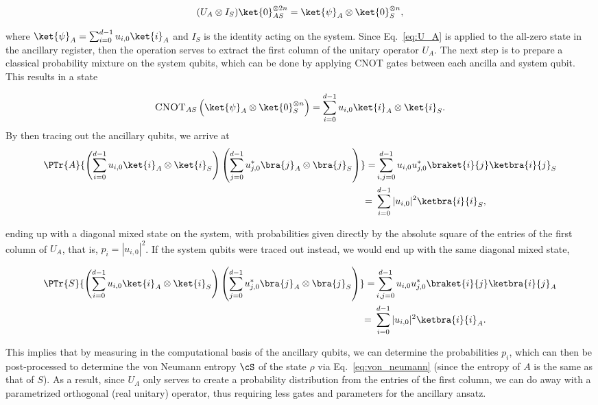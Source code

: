 \begin{equation}
    (U_A \otimes I_S) \ket{0}_{AS}^{\otimes 2n} = \ket{\psi}_{A} \otimes \ket{0}_{S}^{\otimes n},
    \label{eq:U_A}
\end{equation}

where $\ket{\psi}_A = \sum_{i=0}^{d - 1} u_{i,0} \ket{i}_A$ and $I_S$
is the identity acting on the system. Since Eq.~\eqref{eq:U_A} is
applied to the all-zero state in the ancillary register, then the
operation serves to extract the first column of the unitary operator
$U_A$. The next step is to prepare a classical probability mixture on
the system qubits, which can be done by applying \textsc{CNOT} gates
between each ancilla and system qubit. This results in a state

\begin{align}
    \textsc{CNOT}_{AS} \left( \ket{\psi}_{A} \otimes \ket{0}_{S}^{\otimes n} \right) = \sum_{i=0}^{d - 1} u_{i,0} \ket{i}_A \otimes \ket{i}_S.
    \label{eq:pre_tfd}
\end{align}
By then tracing out the ancillary qubits, we arrive at
\begin{align}
    \PTr{A}{\left( \sum_{i=0}^{d-1} u_{i,0}\ket{i}_A \otimes \ket{i}_S \right) \left( \sum_{j=0}^{d-1} u_{j,0}^* \bra{j}_A \otimes \bra{j}_S \right)} = &\sum_{i,j=0}^{d-1} u_{i,0}u_{j,0}^* \braket{i}{j} \ketbra{i}{j}_S \nonumber \\ = \
    &\sum_{i=0}^{d-1} |u_{i,0}|^2 \ketbra{i}{i}_S,
    \label{eq:diag}
\end{align}

ending up with a diagonal mixed state on the system, with
probabilities given directly by the absolute square of the entries of
the first column of $U_A$, that is, $p_i = |u_{i,0}|^2$. If the system
qubits were traced out instead, we would end up with the same diagonal
mixed state,

\begin{align}
    \PTr{S}{\left( \sum_{i=0}^{d-1} u_{i,0}\ket{i}_A \otimes \ket{i}_S \right) \left( \sum_{j=0}^{d-1} u_{j,0}^* \bra{j}_A \otimes \bra{j}_S \right)} = &\sum_{i,j=0}^{d-1} u_{i,0}u_{j,0}^* \braket{i}{j} \ketbra{i}{j}_A \nonumber \\ = \
    &\sum_{i=0}^{d-1} |u_{i,0}|^2 \ketbra{i}{i}_A.
\end{align}

This implies that by measuring in the computational basis of the
ancillary qubits, we can determine the probabilities $p_i$, which can
then be post-processed to determine the von Neumann entropy $\cS$ of
the state $\rho$ via Eq.~\eqref{eq:von_neumann} (since the entropy of
$A$ is the same as that of $S$). As a result, since $U_A$ only serves
to create a probability distribution from the entries of the first
column, we can do away with a parametrized orthogonal (real unitary)
operator, thus requiring less gates and parameters for the ancillary
ansatz.

